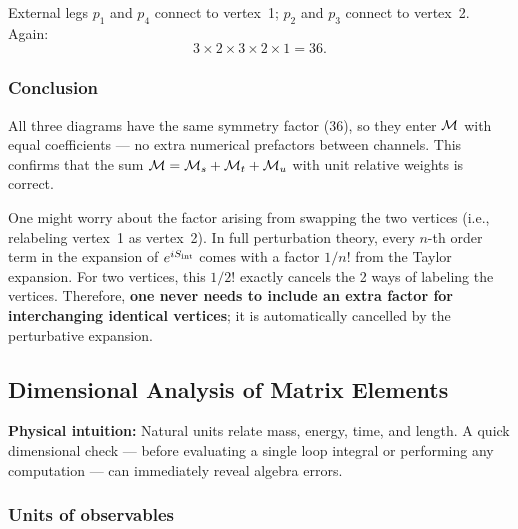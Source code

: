 \documentclass[../main.tex]{subfiles}
\begin{document}
External legs $p_1$ and $p_4$ connect to vertex~1; $p_2$ and $p_3$ connect to vertex~2.  Again:
\[
  3\times 2\times 3\times 2\times 1 = 36.
\]

\subsubsection*{Conclusion}

All three diagrams have the same symmetry factor (36), so they enter $\mathcal{M}$ with equal coefficients — no extra numerical prefactors between channels.  This confirms that the sum $\mathcal{M} = \mathcal{M}_s + \mathcal{M}_t + \mathcal{M}_u$ with unit relative weights is correct.

\begin{remark}
One might worry about the factor arising from swapping the two vertices (i.e., relabeling vertex~1 as vertex~2).  In full perturbation theory, every $n$-th order term in the expansion of $e^{iS_{\rm int}}$ comes with a factor $1/n!$ from the Taylor expansion.  For two vertices, this $1/2!$ exactly cancels the 2 ways of labeling the vertices.  Therefore, \textbf{one never needs to include an extra factor for interchanging identical vertices}; it is automatically cancelled by the perturbative expansion.
\end{remark}


\subsection*{Dimensional Analysis of Matrix Elements}

\noindent\textbf{Physical intuition:} Natural units relate mass, energy, time, and length.  A quick dimensional check — before evaluating a single loop integral or performing any computation — can immediately reveal algebra errors.

\subsubsection*{Units of observables}
\end{document}
